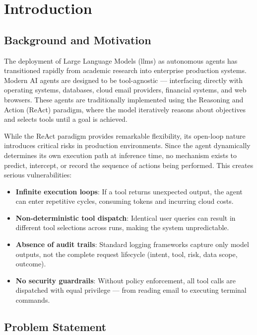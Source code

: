 \chapter{Introduction}

\section{Background and Motivation}

The deployment of Large Language Models (\glspl{llm}) as autonomous agents has transitioned rapidly from academic research into enterprise production systems. Modern AI agents are designed to be tool-agnostic — interfacing directly with operating systems, databases, cloud email providers, financial systems, and web browsers. These agents are traditionally implemented using the Reasoning and Action (ReAct) paradigm, where the model iteratively reasons about objectives and selects tools until a goal is achieved.

While the ReAct paradigm provides remarkable flexibility, its open-loop nature introduces critical risks in production environments. Since the agent dynamically determines its own execution path at inference time, no mechanism exists to predict, intercept, or record the sequence of actions being performed. This creates serious vulnerabilities:

\begin{itemize}[leftmargin=1.5em]
  \item \textbf{Infinite execution loops}: If a tool returns unexpected output, the agent can enter repetitive cycles, consuming tokens and incurring cloud costs.
  \item \textbf{Non-deterministic tool dispatch}: Identical user queries can result in different tool selections across runs, making the system unpredictable.
  \item \textbf{Absence of audit trails}: Standard logging frameworks capture only model outputs, not the complete request lifecycle (intent, tool, risk, data scope, outcome).
  \item \textbf{No security guardrails}: Without policy enforcement, all tool calls are dispatched with equal privilege — from reading email to executing terminal commands.
\end{itemize}

\section{Problem Statement}

